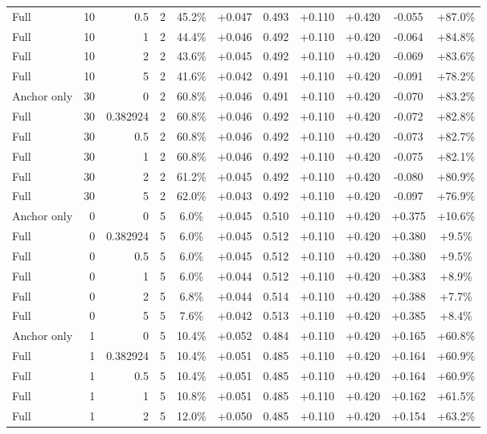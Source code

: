 \begin{table}[htbp]
\begin{tabular}{lrrrccccccc}
Full & 10 & 0.5 & 2 & 45.2\% & +0.047 & 0.493 & +0.110 & +0.420 & -0.055 & +87.0\% \\
Full & 10 & 1 & 2 & 44.4\% & +0.046 & 0.492 & +0.110 & +0.420 & -0.064 & +84.8\% \\
Full & 10 & 2 & 2 & 43.6\% & +0.045 & 0.492 & +0.110 & +0.420 & -0.069 & +83.6\% \\
Full & 10 & 5 & 2 & 41.6\% & +0.042 & 0.491 & +0.110 & +0.420 & -0.091 & +78.2\% \\
Anchor only & 30 & 0 & 2 & 60.8\% & +0.046 & 0.491 & +0.110 & +0.420 & -0.070 & +83.2\% \\
Full & 30 & 0.382924 & 2 & 60.8\% & +0.046 & 0.492 & +0.110 & +0.420 & -0.072 & +82.8\% \\
Full & 30 & 0.5 & 2 & 60.8\% & +0.046 & 0.492 & +0.110 & +0.420 & -0.073 & +82.7\% \\
Full & 30 & 1 & 2 & 60.8\% & +0.046 & 0.492 & +0.110 & +0.420 & -0.075 & +82.1\% \\
Full & 30 & 2 & 2 & 61.2\% & +0.045 & 0.492 & +0.110 & +0.420 & -0.080 & +80.9\% \\
Full & 30 & 5 & 2 & 62.0\% & +0.043 & 0.492 & +0.110 & +0.420 & -0.097 & +76.9\% \\
Anchor only & 0 & 0 & 5 & 6.0\% & +0.045 & 0.510 & +0.110 & +0.420 & +0.375 & +10.6\% \\
Full & 0 & 0.382924 & 5 & 6.0\% & +0.045 & 0.512 & +0.110 & +0.420 & +0.380 & +9.5\% \\
Full & 0 & 0.5 & 5 & 6.0\% & +0.045 & 0.512 & +0.110 & +0.420 & +0.380 & +9.5\% \\
Full & 0 & 1 & 5 & 6.0\% & +0.044 & 0.512 & +0.110 & +0.420 & +0.383 & +8.9\% \\
Full & 0 & 2 & 5 & 6.8\% & +0.044 & 0.514 & +0.110 & +0.420 & +0.388 & +7.7\% \\
Full & 0 & 5 & 5 & 7.6\% & +0.042 & 0.513 & +0.110 & +0.420 & +0.385 & +8.4\% \\
Anchor only & 1 & 0 & 5 & 10.4\% & +0.052 & 0.484 & +0.110 & +0.420 & +0.165 & +60.8\% \\
Full & 1 & 0.382924 & 5 & 10.4\% & +0.051 & 0.485 & +0.110 & +0.420 & +0.164 & +60.9\% \\
Full & 1 & 0.5 & 5 & 10.4\% & +0.051 & 0.485 & +0.110 & +0.420 & +0.164 & +60.9\% \\
Full & 1 & 1 & 5 & 10.8\% & +0.051 & 0.485 & +0.110 & +0.420 & +0.162 & +61.5\% \\
Full & 1 & 2 & 5 & 12.0\% & +0.050 & 0.485 & +0.110 & +0.420 & +0.154 & +63.2\% \\

\end{tabular}
\end{table}

